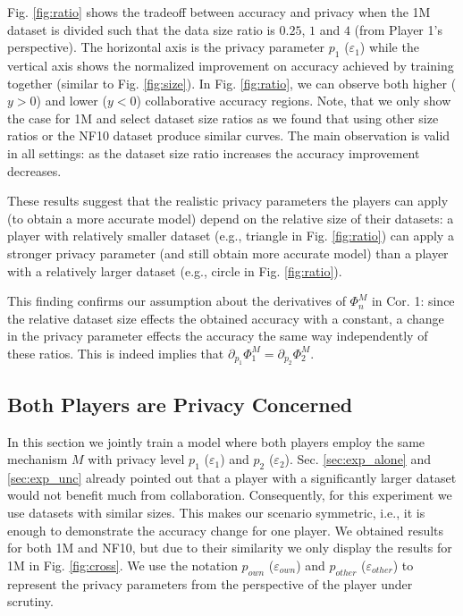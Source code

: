 \documentclass[USenglish,oneside,twocolumn]{article}
\theoremstyle{plain}
\begin{document}
    Fig. \ref{fig:ratio} shows the tradeoff between accuracy and privacy when the 1M dataset is divided such that the data size ratio is $0.25$, $1$ and $4$ (from Player 1's perspective). The horizontal axis is the privacy parameter $p_1$ ($\varepsilon_1$) while the vertical axis shows the normalized improvement on accuracy achieved by training together (similar to Fig. \ref{fig:size}). In Fig. \ref{fig:ratio}, we can observe both higher ($y>0$) and lower ($y<0$) collaborative accuracy regions. Note, that we only show the case for 1M and select dataset size ratios as we found that using other size ratios or the NF10 dataset produce similar curves. The main observation is valid in all settings: as the dataset size ratio increases the accuracy improvement decreases.
    
    These results suggest that the realistic privacy parameters the players can apply (to obtain a more accurate model) depend on the relative size of their datasets: a player with relatively smaller dataset (e.g., triangle in Fig. \ref{fig:ratio}) can apply a stronger privacy parameter (and still obtain more accurate model) than a player with a relatively larger dataset (e.g., circle in Fig. \ref{fig:ratio}). 
    
    This finding confirms our assumption about the derivatives of $\Phi^M_n$ in Cor. 1: since the relative dataset size effects the obtained accuracy with a constant, a change in the privacy parameter effects the accuracy the same way independently of these ratios. This is indeed implies that $\partial_{p_1}\Phi_1^M=\partial_{p_2}\Phi_2^M$.
    
    \vspace{-0.5cm}
    \subsection{Both Players are Privacy Concerned}
    \vspace{-0.25cm}
    
    In this section we jointly train a model where both players employ the same mechanism $M$ with privacy level $p_1$ ($\varepsilon_1$) and $p_2$ ($\varepsilon_2$). Sec. \ref{sec:exp_alone} and \ref{sec:exp_unc} already pointed out that a player with a significantly larger dataset would not benefit much from collaboration. Consequently, for this experiment we use datasets with similar sizes. This makes our scenario symmetric, i.e., it is enough to demonstrate the accuracy change for one player. We obtained results for both 1M and NF10, but due to their similarity we only display the results for 1M in Fig. \ref{fig:cross}. We use the notation $p_{own}$ ($\varepsilon_{own}$) and $p_{other}$ ($\varepsilon_{other}$) to represent the privacy parameters from the perspective of the player under scrutiny.
    
\end{document}
